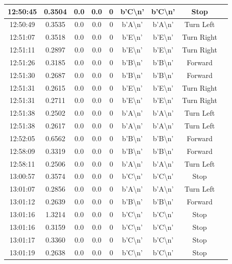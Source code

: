 \begin{table}[H]
\begin{tabular}{|c|c|c|c|c|c|c|c|c|}
    12:50:45 & 0.3504 & 0.0 & 0.0 & 0 & b'C\textbackslash n' & b'C\textbackslash n' & Stop \\ \hline
    12:50:49 & 0.3535 & 0.0 & 0.0 & 0 & b'A\textbackslash n' & b'A\textbackslash n' & Turn Left \\ \hline
    12:51:07 & 0.3518 & 0.0 & 0.0 & 0 & b'E\textbackslash n' & b'E\textbackslash n' & Turn Right \\ \hline
    12:51:11 & 0.2897 & 0.0 & 0.0 & 0 & b'E\textbackslash n' & b'E\textbackslash n' & Turn Right \\ \hline
    12:51:26 & 0.3185 & 0.0 & 0.0 & 0 & b'B\textbackslash n' & b'B\textbackslash n' & Forward \\ \hline
    12:51:30 & 0.2687 & 0.0 & 0.0 & 0 & b'B\textbackslash n' & b'B\textbackslash n' & Forward \\ \hline
    12:51:31 & 0.2615 & 0.0 & 0.0 & 0 & b'E\textbackslash n' & b'E\textbackslash n' & Turn Right \\ \hline
    12:51:31 & 0.2711 & 0.0 & 0.0 & 0 & b'E\textbackslash n' & b'E\textbackslash n' & Turn Right \\ \hline
    12:51:38 & 0.2502 & 0.0 & 0.0 & 0 & b'A\textbackslash n' & b'A\textbackslash n' & Turn Left \\ \hline
    12:51:38 & 0.2617 & 0.0 & 0.0 & 0 & b'A\textbackslash n' & b'A\textbackslash n' & Turn Left \\ \hline
    12:52:05 & 0.6562 & 0.0 & 0.0 & 0 & b'B\textbackslash n' & b'B\textbackslash n' & Forward \\ \hline
    12:58:09 & 0.3319 & 0.0 & 0.0 & 0 & b'B\textbackslash n' & b'B\textbackslash n' & Forward \\ \hline
    12:58:11 & 0.2506 & 0.0 & 0.0 & 0 & b'A\textbackslash n' & b'A\textbackslash n' & Turn Left \\ \hline
    13:00:57 & 0.3574 & 0.0 & 0.0 & 0 & b'C\textbackslash n' & b'C\textbackslash n' & Stop \\ \hline
    13:01:07 & 0.2856 & 0.0 & 0.0 & 0 & b'A\textbackslash n' & b'A\textbackslash n' & Turn Left \\ \hline
    13:01:12 & 0.2639 & 0.0 & 0.0 & 0 & b'B\textbackslash n' & b'B\textbackslash n' & Forward \\ \hline
    13:01:16 & 1.3214 & 0.0 & 0.0 & 0 & b'C\textbackslash n' & b'C\textbackslash n' & Stop \\ \hline
    13:01:16 & 0.3159 & 0.0 & 0.0 & 0 & b'C\textbackslash n' & b'C\textbackslash n' & Stop \\ \hline
    13:01:17 & 0.3360 & 0.0 & 0.0 & 0 & b'C\textbackslash n' & b'C\textbackslash n' & Stop \\ \hline
    13:01:19 & 0.2638 & 0.0 & 0.0 & 0 & b'C\textbackslash n' & b'C\textbackslash n' & Stop \\ \hline
    \end{tabular}
\end{table}
